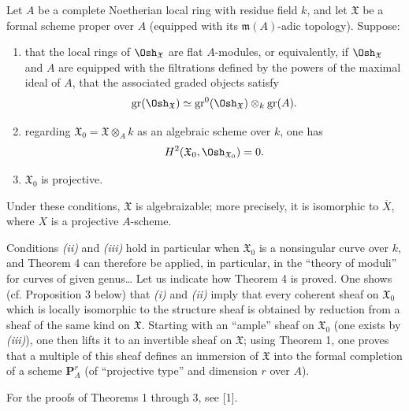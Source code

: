 Let $A$ be a complete Noetherian local ring with residue
field $k$, and let $\mathfrak X$ be a formal scheme proper over $A$ (equipped
with its $\mathfrak m(A)$-adic topology). Suppose:
\begin{enumerate}
  \item[\textit{i.}] that the local rings of $\Osh_{\mathfrak X}$ are flat
    $A$-modules, or equivalently, if $\Osh_{\mathfrak X}$ and $A$ are equipped
    with the filtrations defined by the powers of the maximal ideal of $A$,
    that the associated graded objects satisfy
    \[
      \operatorname{gr}(\Osh_{\mathfrak X})
      \simeq
      \operatorname{gr}^{0}(\Osh_{\mathfrak X})
      \otimes_k\operatorname{gr}(A).
    \]
  \item[\textit{ii.}] regarding
    $\mathfrak X_0=\mathfrak X\otimes_A k$ as an algebraic scheme over $k$, one
    has
    \[
      H^2(\mathfrak X_0,\Osh_{\mathfrak X_0})=0.
    \]
  \item[\textit{iii.}] $\mathfrak X_0$ is projective.
\end{enumerate}
Under these conditions, $\mathfrak X$ is algebraizable; more precisely, it is
isomorphic to $\overline X$, where $X$ is a projective $A$-scheme.

Conditions \textit{(ii)} and \textit{(iii)} hold in particular when
$\mathfrak X_0$ is a nonsingular curve over $k$, and Theorem 4 can therefore
be applied, in particular, in the “theory of moduli” for curves of given
genus\ldots{} Let us indicate how Theorem 4 is proved. One shows (cf.
Proposition 3 below) that \textit{(i)} and \textit{(ii)} imply that every
coherent sheaf on $\mathfrak X_0$ which is locally isomorphic to the structure
sheaf is obtained by reduction from a sheaf of the same kind on
$\mathfrak X$. Starting with an “ample” sheaf on $\mathfrak X_0$ (one exists
by \textit{(iii)}), one then lifts it to an invertible sheaf on $\mathfrak X$;
using Theorem 1, one proves that a multiple of this sheaf defines an immersion
of $\mathfrak X$ into the formal completion of a scheme $\mathbf P_A^r$ (of
“projective type” and dimension $r$ over $A$).

For the proofs of Theorems 1 through 3, see [1].


